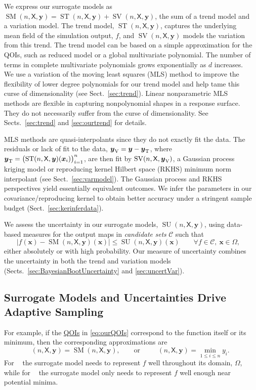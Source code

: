 \documentclass[11pt]{NSFamsart}
\newcommand{\QOIs}{\hyperlink{QOIlink}{QOIs}\xspace}
\DeclareMathOperator{\SURR}{SM} %
\DeclareMathOperator{\STREND}{ST} %
\DeclareMathOperator{\SVAR}{SV} %
\newcommand{\MLS}{\textrm{MLS}\xspace} %
\DeclareMathOperator{\MIN}{MIN}
\DeclareMathOperator{\ID}{ID}
\DeclareMathOperator{\APPMIN}{\widehat{\MIN}}
\DeclareMathOperator{\APPID}{\widehat{\ID}}
\DeclareMathOperator{\SURRERR}{SU}
\newcommand{\TREND}{\textup{T}}
\newcommand{\VAR}{\textup{V}}
\newcommand{\mX}{\mathsf{X}}
\newcommand{\bx}{{\boldsymbol{x}}}
\newcommand{\by}{{\boldsymbol{y}}}
\newcommand{\calc}{{\mathcal{C}}}
\def\abs#1{\ensuremath{\left \lvert #1 \right \rvert}}
\begin{document}
We express our surrogate models as $\SURR(n,\mX,\by) = \STREND(n,\mX,\by) + \SVAR(n,\mX,\by)$, the sum of a trend model and a variation model. 
The trend model, $\STREND(n,\mX,\by)$, captures the underlying mean field of the simulation output, $f$, and $\SVAR(n,\mX,\by)$ models the variation from this trend. 
The trend model can be based on a simple approximation for the QOIs, such as reduced model or a global multivariate polynomial.
The number of terms in complete multivariate polynomials grows exponentially as $d$ increases. 
We use a variation of the moving least squares (\MLS) method \cite{liumovingpartI1997, limovingpartII1996, salehi2013generalized, mederos2003moving} to improve the flexibility of lower degree polynomials
for our trend model and help tame this curse of dimensionality (see Sect.\ \ref{sec:trend}). Linear nonparametric \MLS methods are flexible in capturing nonpolynomial shapes in a response surface. They do not necessarily suffer from the curse of dimensionality. 
See Sects.\ \ref{sec:trend} and \ref{sec:ourtrend}  for details. 

\MLS methods are quasi-interpolants since they do not exactly fit the data. 
The residuals or lack of fit to the data, $\by_{\VAR} = \by - \by_{\TREND}$, where $\by_{\TREND} = \bigl( \STREND(n,\mX,\by)(\bx_i) \bigr)_{i=1}^n$, are then  fit by $\SVAR(n,\mX,\by_{\VAR})$, a Gaussian process kriging model or reproducing kernel Hilbert space (RKHS) minimum norm interpolant (see Sect.\ \ref{sec:varmodel}). The Gaussian process and RKHS perspectives yield essentially equivalent outcomes. We infer the parameters in our covariance/reproducing kernel to obtain better accuracy under a stringent sample budget (Sect.\ \ref{sec:kerinferdata}). 

We assess the uncertainty in our surrogate models, $\SURRERR(n,\mX,\by)$, using data-based measures for the output maps in \emph{candidate sets} $\calc$ such that 
\begin{equation} \label{eq:surrUncert}
\abs{f(\bx)-\SURR(n,\mX,\by)(\bx)} \le \SURRERR(n,\mX,\by)(\bx) \qquad \forall f \in \calc,\ \bx \in \Omega,
\end{equation} 
either absolutely or with high probability. Our measure of uncertainty combines the uncertainty in both the trend and variation models (Sects.\ \ref{sec:BayesianBootUncertainty} and \ref{sec:uncertVar}).

\subsection{Surrogate Models and Uncertainties Drive Adaptive Sampling} 
For example, if the \QOIs in \eqref{eq:ourQOIs} correspond to the function itself or its minimum, then the corresponding approximations are
\begin{equation} \label{eq:QOIhat}
\APPID(n,\mX,\by) = \SURR(n,\mX,\by), \qquad \text{or}\qquad \APPMIN(n,\mX,\by) = \min_{1 \le i \le n} y_i.
\end{equation}
For $\APPID$ the surrogate model needs to represent $f$ well throughout its domain, $\Omega$, while for $\APPMIN$ the surrogate model only needs to represent $f$ well enough near potential minima.
\end{document}
